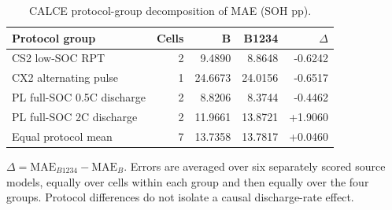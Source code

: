 \begin{table}[!p]\centering
\caption{CALCE protocol-group decomposition of MAE (SOH pp).}\label{tab:calceprotocols}
\papertablesize\setlength{\tabcolsep}{4pt}\renewcommand{\arraystretch}{1.15}
\begin{tabular}{lrrrr}\toprule
Protocol group & Cells & B & B1234 & $\Delta$ \\ \midrule
CS2 low-SOC RPT & 2 & 9.4890 & 8.8648 & -0.6242 \\
CX2 alternating pulse & 1 & 24.6673 & 24.0156 & -0.6517 \\
PL full-SOC 0.5C discharge & 2 & 8.8206 & 8.3744 & -0.4462 \\
PL full-SOC 2C discharge & 2 & 11.9661 & 13.8721 & +1.9060 \\
Equal protocol mean & 7 & 13.7358 & 13.7817 & +0.0460 \\
\bottomrule\end{tabular}
\par\smallskip\begin{minipage}{\linewidth}\papertablesize $\Delta=\mathrm{MAE}_{B1234}-\mathrm{MAE}_B$. Errors are averaged over six separately scored source models, equally over cells within each group and then equally over the four groups. Protocol differences do not isolate a causal discharge-rate effect.\end{minipage}
\end{table}
